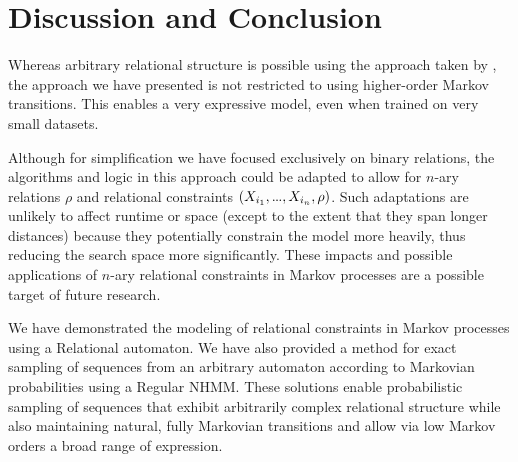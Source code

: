 \documentclass[phd,electronic,oneside,twosidetoc,letterpaper,chaptercenter,parttop,lof,lot]{byumsphd}
\newcommand\mydots{\hbox to .75em{.\hss.\hss.}}
\begin{document}
%
%
%
%

\section{Discussion and Conclusion}

Whereas arbitrary relational structure is possible using the approach taken by \citeauthor{bodily2018floating} \cite{bodily2018floating}, the approach we have presented is not restricted to using higher-order Markov transitions. This enables a very expressive model, even when trained on very small datasets. 

Although for simplification we have focused exclusively on binary relations, the algorithms and logic in this approach could be adapted to allow for $n$-ary relations $\rho$ and relational constraints $(X_{i_1},\mydots,X_{i_n},\rho)$. Such adaptations are unlikely to affect runtime or space (except to the extent that they span longer distances) because they potentially constrain the model more heavily, thus reducing the search space more significantly. These impacts and possible applications of $n$-ary relational constraints in Markov processes are a possible target of future research.

We have demonstrated the modeling of relational constraints in Markov processes using a {\sc Relational} automaton. We have also provided a method for exact sampling of sequences from an arbitrary automaton according to Markovian probabilities using a {\sc Regular} NHMM. These solutions enable probabilistic sampling of sequences that exhibit arbitrarily complex relational structure while also maintaining natural, fully Markovian transitions and allow via low Markov orders a broad range of expression.
\end{document}
